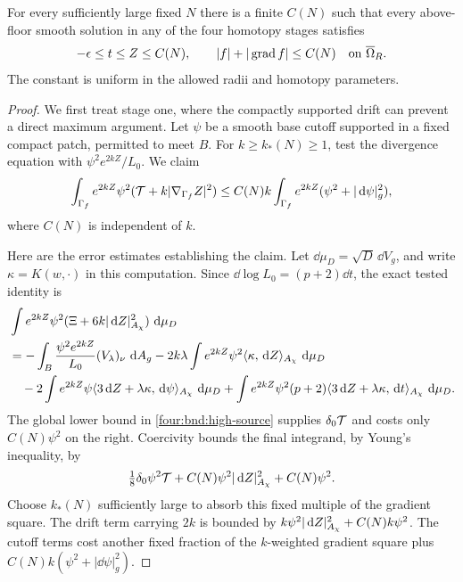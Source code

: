 \begin{proposition}\label{four:prop:bounded-range}
For every sufficiently large fixed $N$ there is a finite $C(N)$
such that every above-floor smooth solution in any of the four
homotopy stages satisfies
\begin{equation}\label{four:eq:bounded-range}
 -\epsilon\le t\le Z\le C(N),\qquad
 |f|+|\operatorname{grad} f|\le C(N)\quad\text{on }\overline\Omega_R.
\end{equation}
The constant is uniform in the allowed radii and homotopy parameters.
\end{proposition}

\begin{proof}
We first treat stage one, where the compactly supported drift can
prevent a direct maximum argument.  Let $\psi$ be a smooth base
cutoff supported in a fixed compact patch, permitted to meet $B$.
For $k\ge k_*(N)\ge1$, test the divergence equation with
$\psi^2e^{2kZ}/L_0$.  We claim
\begin{equation}\label{four:bnd:exponential-energy}
 \int_{\Gamma_f}e^{2kZ}\psi^2
       (\mathcal T+k|\nabla_{\Gamma_f}Z|^2)
 \le C(N)k\int_{\Gamma_f}e^{2kZ}
       (\psi^2+|\,\mathrm d\psi|_g^2),
\end{equation}
where $C(N)$ is independent of $k$.

Here are the error estimates establishing the claim.  Let
$\dd\mu_D=\sqrt D\,\dd V_g$, and write
$\kappa=K(w,\cdot)$ in this computation.  Since
$\dd\log L_0=(p+2)\dd t$, the exact tested identity is
\begin{align*}
 &\int e^{2kZ}\psi^2
      (\Xi+6k|\,\mathrm d Z|_{A_\chi}^2)\,\,\mathrm d\mu_D\\
 &=-\int_B\frac{\psi^2e^{2kZ}}{L_0}(V_\lambda)_\nu\,\,\mathrm d A_g
   -2k\lambda\int e^{2kZ}\psi^2
                   \langle\kappa,\,\mathrm d Z\rangle_{A_\chi}\,\,\mathrm d\mu_D\\
 &\quad-2\int e^{2kZ}\psi
             \langle3\,\mathrm d Z+\lambda\kappa,\,\mathrm d\psi\rangle_{A_\chi}\,\,\mathrm d\mu_D
   +\int e^{2kZ}\psi^2(p+2)
             \langle3\,\mathrm d Z+\lambda\kappa,\,\mathrm d t\rangle_{A_\chi}\,\,\mathrm d\mu_D.
\end{align*}
The global lower bound in \eqref{four:bnd:high-source} supplies
$\delta_0\mathcal T$ and costs only $C(N)\psi^2$ on the right.
Coercivity bounds the final integrand, by Young's inequality, by
\[
 \tfrac18\delta_0\psi^2\mathcal T
       +C(N)\psi^2|\,\mathrm d Z|_{A_\chi}^2+C(N)\psi^2.
\]
Choose $k_*(N)$ sufficiently large to absorb this fixed multiple of
the gradient square.  The drift term carrying $2k$ is bounded by
$k\psi^2|\,\mathrm d Z|_{A_\chi}^2+C(N)k\psi^2$.
The cutoff terms cost another fixed fraction of the $k$-weighted
gradient square plus $C(N)k(\psi^2+|\dd\psi|_g^2)$.


\end{proof}
